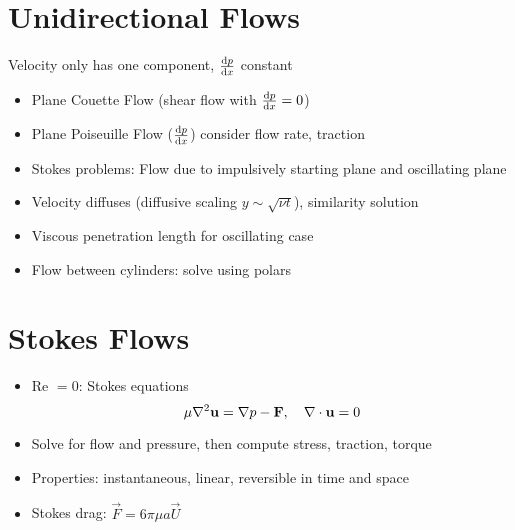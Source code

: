 \section{Unidirectional Flows}
Velocity only has one component, $\frac{\mathrm{d}{p}}{\mathrm{d}{x}}$ constant
\begin{itemize}
    \item Plane Couette Flow (shear flow with $\frac{\mathrm{d}{p}}{\mathrm{d}{x}} = 0$)
    \item Plane Poiseuille Flow ($\frac{\mathrm{d}{p}}{\mathrm{d}{x}}$) consider flow rate, traction
    \item Stokes problems: Flow due to impulsively starting plane and oscillating plane
    \item Velocity diffuses (diffusive scaling $y \sim \sqrt{\nu t}$), similarity solution
    \item Viscous penetration length for oscillating case
    \item Flow between cylinders: solve using polars
\end{itemize}

\section{Stokes Flows}
\begin{itemize}
    \item Re $= 0$: Stokes equations \[\mu \nabla^2 \boldsymbol{\mathbf{u}} =  \mathbf{\nabla} p- \boldsymbol{\mathbf{F}}, \quad  \nabla \cdot \boldsymbol{\mathbf{u}} = 0\]
    \item Solve for flow and pressure, then compute stress, traction, torque
    \item Properties: instantaneous, linear, reversible in time and space
    \item Stokes drag: $\vec{F}=6\pi\mu a\vec{U}$

\end{itemize}

